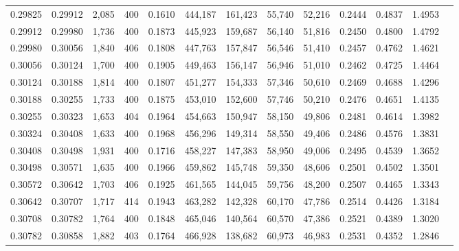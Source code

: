 \begin{tabular}{rrrrrrrrrrrrr}
0.29825 & 0.29912 &  2,085 & 400 &                                     0.1610 & 444,187 & 161,423 &  55,740 &  52,216 & 0.2444 & 0.4837 & 1.4953 \\
0.29912 & 0.29980 &  1,736 & 400 &                                     0.1873 & 445,923 & 159,687 &  56,140 &  51,816 & 0.2450 & 0.4800 & 1.4792 \\
0.29980 & 0.30056 &  1,840 & 406 &                                     0.1808 & 447,763 & 157,847 &  56,546 &  51,410 & 0.2457 & 0.4762 & 1.4621 \\
0.30056 & 0.30124 &  1,700 & 400 &                                     0.1905 & 449,463 & 156,147 &  56,946 &  51,010 & 0.2462 & 0.4725 & 1.4464 \\
0.30124 & 0.30188 &  1,814 & 400 &                                     0.1807 & 451,277 & 154,333 &  57,346 &  50,610 & 0.2469 & 0.4688 & 1.4296 \\
0.30188 & 0.30255 &  1,733 & 400 &                                     0.1875 & 453,010 & 152,600 &  57,746 &  50,210 & 0.2476 & 0.4651 & 1.4135 \\
0.30255 & 0.30323 &  1,653 & 404 &                                     0.1964 & 454,663 & 150,947 &  58,150 &  49,806 & 0.2481 & 0.4614 & 1.3982 \\
0.30324 & 0.30408 &  1,633 & 400 &                                     0.1968 & 456,296 & 149,314 &  58,550 &  49,406 & 0.2486 & 0.4576 & 1.3831 \\
0.30408 & 0.30498 &  1,931 & 400 &                                     0.1716 & 458,227 & 147,383 &  58,950 &  49,006 & 0.2495 & 0.4539 & 1.3652 \\
0.30498 & 0.30571 &  1,635 & 400 &                                     0.1966 & 459,862 & 145,748 &  59,350 &  48,606 & 0.2501 & 0.4502 & 1.3501 \\
0.30572 & 0.30642 &  1,703 & 406 &                                     0.1925 & 461,565 & 144,045 &  59,756 &  48,200 & 0.2507 & 0.4465 & 1.3343 \\
0.30642 & 0.30707 &  1,717 & 414 &                                     0.1943 & 463,282 & 142,328 &  60,170 &  47,786 & 0.2514 & 0.4426 & 1.3184 \\
0.30708 & 0.30782 &  1,764 & 400 &                                     0.1848 & 465,046 & 140,564 &  60,570 &  47,386 & 0.2521 & 0.4389 & 1.3020 \\
0.30782 & 0.30858 &  1,882 & 403 &                                     0.1764 & 466,928 & 138,682 &  60,973 &  46,983 & 0.2531 & 0.4352 & 1.2846 \\

\end{tabular}
